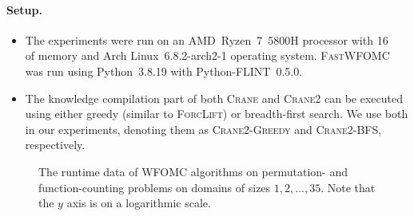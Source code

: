 \documentclass{article}
\theoremstyle{definition}
\newcommand{\Cranetwo}{\textsc{Crane2}}
\newcommand{\Cranebfs}{\textsc{Crane2-BFS}}
\newcommand{\Cranegreedy}{\textsc{Crane2-Greedy}}
\begin{document}
\paragraph{Setup.}
\begin{itemize}
  \item The experiments were run on an AMD~Ryzen~7~5800H processor with
        \SI{16}{\gibi\byte} of memory and Arch Linux~6.8.2-arch2-1 operating
        system. \textsc{FastWFOMC} was run using Python~3.8.19 with
        Python-FLINT~0.5.0.
  \item The knowledge compilation part of both \textsc{Crane} and \Cranetwo{}
        can be executed using either greedy (similar to \textsc{ForcLift}) or
        breadth-first search. We use both in our experiments, denoting them as
        \Cranegreedy{} and \Cranebfs{}, respectively.
\end{itemize}

\begin{figure}
  \centering
  
  \caption{The runtime data of WFOMC algorithms on permutation- and
    function-counting problems on domains of sizes $1, 2, \dots, 35$. Note that
    the $y$ axis is on a logarithmic scale.}\label{fig:plot}
\end{figure}
\end{document}
